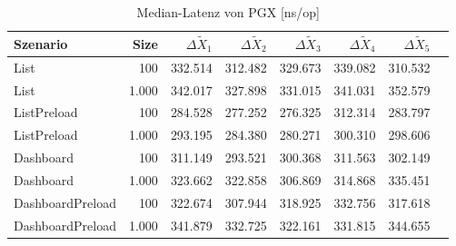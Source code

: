 
\begin{table}[ht]
\setlength{\extrarowheight}{-1pt}
\centering
\caption{Median-Latenz von PGX [ns/op]}
\begin{tabular}{lrrrrrrr}
\toprule
Szenario & Size & ${\Delta \tilde{X}_1}$ & ${\Delta \tilde{X}_2}$ & ${\Delta \tilde{X}_3}$ & ${\Delta \tilde{X}_4}$ & ${\Delta \tilde{X}_5}$ \\
\midrule
	List & 100 & \cellcolor{red!2}  332.514 & \cellcolor{red!4}  312.482 & \cellcolor{red!2}  329.673 & \cellcolor{red!6}  339.082 & \cellcolor{green!4}  310.532 \\
	List & 1.000 & \cellcolor{red!6}  342.017 & \cellcolor{green!6}  327.898 & \cellcolor{red!4}  331.015 & \cellcolor{red!2}  341.031 & \cellcolor{red!1}  352.579 \\
	ListPreload & 100 & \cellcolor{green!15}  284.528 & \cellcolor{green!12}  277.252 & \cellcolor{green!12}  276.325 & \cellcolor{green!8}  312.314 & \cellcolor{green!16}  283.797 \\
	ListPreload & 1.000 & \cellcolor{green!14}  293.195 & \cellcolor{green!18}  284.380 & \cellcolor{green!15}  280.271 & \cellcolor{green!10}  300.310 & \cellcolor{green!17}  298.606 \\
	Dashboard & 100 & \cellcolor{green!3}  311.149 & \cellcolor{green!5}  293.521 & \cellcolor{green!4}  300.368 & \cellcolor{red!1}  311.563 & \cellcolor{green!3}  302.149 \\
	Dashboard & 1.000 & \cellcolor{green!3}  323.662 & \cellcolor{green!6}  322.858 & \cellcolor{green!3}  306.869 & \cellcolor{green!5}  314.868 & \cellcolor{green!5}  335.451 \\
	DashboardPreload & 100 & \cellcolor{green!1}  322.674 & \cellcolor{green!3}  307.944 & \cellcolor{red!1}  318.925 & \cellcolor{red!2}  332.756 & \cellcolor{green!1}  317.618 \\
	DashboardPreload & 1.000 & \cellcolor{red!1}  341.879 & \cellcolor{green!3}  332.725 & \cellcolor{red!1}  322.161 & \cellcolor{red!1}  331.815 & \cellcolor{green!1}  344.655 \\
\bottomrule
\end{tabular}
\label{tab:latenz_pgx}
\end{table}
	